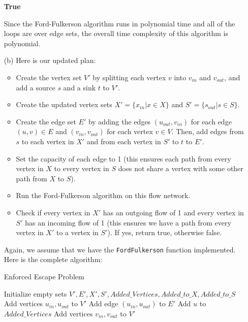 \documentclass{article}
\begin{document}
\begin{itemize}
\begin{algorithm}[H]
\begin{algorithmic}[1]
          \EndFor
          \State \Return \textbf{True}
        \EndFunction
      \end{algorithmic}
    \end{algorithm}
    Since the Ford-Fulkerson algorithm runs in polynomial time and all of the loops are over edge sets, the overall time complexity of this algorithm is polynomial.
  \item[(b)] Here is our updated plan:
    \begin{itemize}
      \item Create the vertex set $V'$ by splitting each vertex $v$ into $v_{in}$ and $v_{out}$, and add a source $s$ and a sink $t$ to $V'$.
      \item Create the updated vertex sets $X' = \{x_{in} | x \in X\}$ and $S' = \{s_{out} | s \in S\}$.
      \item Create the edge set $E'$ by adding the edges $(u_{out}, v_{in})$ for each edge $(u, v) \in E$ and $(v_{in}, v_{out})$ for each vertex $v \in V$.
      Then, add edges from $s$ to each vertex in $X'$ and from each vertex in $S'$ to $t$ to $E'$.
      \item Set the capacity of each edge to 1 (this ensures each path from every vertex in $X$ to every vertex in $S$ does not share a vertex with some other path from $X$ to $S$).
      \item Run the Ford-Fulkerson algorithm on this flow network.
      \item Check if every vertex in $X'$ has an outgoing flow of 1 and every vertex in $S'$ has an incoming flow of 1 (this ensures we have a path from every vertex in $X'$ to a vertex in $S'$).
      If yes, return true, otherwise false.
    \end{itemize}
    Again, we assume that we have the \texttt{FordFulkerson} function implemented.
    Here is the complete algorithm:
    \begin{algorithm}[H]
      \caption{Enforced Escape Problem}
      \begin{algorithmic}[1]
          \State Initialize empty sets $V', E', X', S', Added\_Vertices, Added\_to\_X, Added\_to\_S$
              \State Add vertices $u_{in}, u_{out}$ to $V'$
              \State Add edge $(u_{in}, u_{out})$ to $E'$
              \State Add $u$ to $Added\_Vertices$
            \EndIf
              \State Add vertices $v_{in}, v_{out}$ to $V'$

\end{algorithmic}
\end{algorithm}
\end{itemize}
\end{document}

